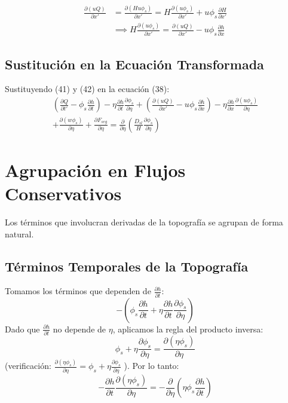 \documentclass[11pt,a4paper]{article}
\begin{document}
\begin{align}
    \frac{\partial(uQ)}{\partial x'} &= \frac{\partial(Hu\phi_s)}{\partial x'} = H\frac{\partial(u\phi_s)}{\partial x'} + u\phi_s\frac{\partial H}{\partial x'} \nonumber \\
    &\implies H\frac{\partial(u\phi_s)}{\partial x'} = \frac{\partial(uQ)}{\partial x'} - u\phi_s\frac{\partial h}{\partial x}
\end{align}

\subsection{Sustitución en la Ecuación Transformada}
Sustituyendo (41) y (42) en la ecuación (38):
\begin{multline}
    \left(\frac{\partial Q}{\partial t'} - \phi_s\frac{\partial h}{\partial t}\right) - \eta\frac{\partial h}{\partial t}\frac{\partial \phi_s}{\partial \eta} + \left(\frac{\partial(uQ)}{\partial x'} - u\phi_s\frac{\partial h}{\partial x}\right) - \eta\frac{\partial h}{\partial x}\frac{\partial(u\phi_s)}{\partial \eta} \\
    + \frac{\partial(w\phi_s)}{\partial \eta} + \frac{\partial F_{seg}}{\partial \eta} = \frac{\partial}{\partial \eta}\left(\frac{D_{sl}}{H}\frac{\partial \phi_s}{\partial \eta}\right)
\end{multline}

\section{Agrupación en Flujos Conservativos}
Los términos que involucran derivadas de la topografía se agrupan de forma natural.

\subsection{Términos Temporales de la Topografía}
Tomamos los términos que dependen de $\frac{\partial h}{\partial t}$:
\begin{equation}
    -\left(\phi_s\frac{\partial h}{\partial t} + \eta\frac{\partial h}{\partial t}\frac{\partial \phi_s}{\partial \eta}\right)
\end{equation}
Dado que $\frac{\partial h}{\partial t}$ no depende de $\eta$, aplicamos la regla del producto inversa:
\begin{equation}
    \phi_s + \eta\frac{\partial \phi_s}{\partial \eta} = \frac{\partial(\eta \phi_s)}{\partial \eta}
\end{equation}
(verificación: $\frac{\partial(\eta \phi_s)}{\partial \eta} = \phi_s + \eta \frac{\partial \phi_s}{\partial \eta}$ \checkmark). Por lo tanto:
\begin{equation}
    -\frac{\partial h}{\partial t}\frac{\partial(\eta \phi_s)}{\partial \eta} = -\frac{\partial}{\partial \eta}\left(\eta \phi_s\frac{\partial h}{\partial t}\right)
\end{equation}
\end{document}
